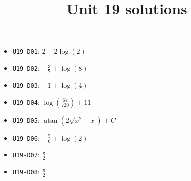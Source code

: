 \title{Unit 19 solutions}\maketitle\begin{itemize}
  \item \texttt{U19-D01}: $2 - 2 \log{\left(2 \right)}$
  \item \texttt{U19-D02}: $- \frac{3}{2} + \log{\left(8 \right)}$
  \item \texttt{U19-D03}: $-1 + \log{\left(4 \right)}$
  \item \texttt{U19-D04}: $\log{\left(\frac{64}{729} \right)} + 11$
  \item \texttt{U19-D05}: $\operatorname{atan}{\left(2 \sqrt{x^{2} + x} \right)}+C$
  \item \texttt{U19-D06}: $- \frac{5}{6} + \log{\left(2 \right)}$
  \item \texttt{U19-D07}: $\frac{\pi}{2}$
  \item \texttt{U19-D08}: $\frac{\pi}{2}$
\end{itemize}
